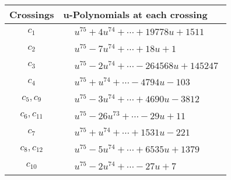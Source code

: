 \documentclass[1p]{elsarticle_modified}
\theoremstyle{definition}
\begin{document}
\begin{tabular}{m{50pt}|m{274pt}}
Crossings & \hspace{64pt}u-Polynomials at each crossing \\
\hline $$\begin{aligned}c_{1}\end{aligned}$$&$\begin{aligned}
&u^{75}+4 u^{74}+\cdots+19778 u+1511
\end{aligned}$\\
\hline $$\begin{aligned}c_{2}\end{aligned}$$&$\begin{aligned}
&u^{75}-7 u^{74}+\cdots+18 u+1
\end{aligned}$\\
\hline $$\begin{aligned}c_{3}\end{aligned}$$&$\begin{aligned}
&u^{75}-2 u^{74}+\cdots-264568 u+145247
\end{aligned}$\\
\hline $$\begin{aligned}c_{4}\end{aligned}$$&$\begin{aligned}
&u^{75}+u^{74}+\cdots-4794 u-103
\end{aligned}$\\
\hline $$\begin{aligned}c_{5},c_{9}\end{aligned}$$&$\begin{aligned}
&u^{75}-3 u^{74}+\cdots+4690 u-3812
\end{aligned}$\\
\hline $$\begin{aligned}c_{6},c_{11}\end{aligned}$$&$\begin{aligned}
&u^{75}-26 u^{73}+\cdots-29 u+11
\end{aligned}$\\
\hline $$\begin{aligned}c_{7}\end{aligned}$$&$\begin{aligned}
&u^{75}+u^{74}+\cdots+1531 u-221
\end{aligned}$\\
\hline $$\begin{aligned}c_{8},c_{12}\end{aligned}$$&$\begin{aligned}
&u^{75}-5 u^{74}+\cdots+6535 u+1379
\end{aligned}$\\
\hline $$\begin{aligned}c_{10}\end{aligned}$$&$\begin{aligned}
&u^{75}-2 u^{74}+\cdots-27 u+7
\end{aligned}$\\
\hline
\end{tabular}\\~\\
\end{document}

